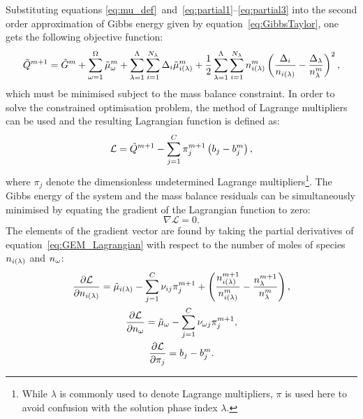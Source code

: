Substituting equations \eqref{eq:mu_def}~and~\eqref{eq:partial1}--\eqref{eq:partial3} into the second order approximation of Gibbs energy given by equation~\eqref{eq:GibbsTaylor}, one gets the following objective function:
\begin{equation}
  \tilde{Q}^{m+1} = \tilde{G}^{m} + \sum_{\omega=1}^{\Omega} \tilde{\mu}_{\omega}^m
                  + \sum_{\lambda=1}^{\Lambda} \sum_{i = 1}^{N_{\lambda}} \Delta_i \tilde{\mu}_{i(\lambda)}^m
                  + \frac{1}{2} \sum_{\lambda=1}^{\Lambda} \sum_{i = 1}^{N_{\lambda}} n_{i(\lambda)}^m \left(\frac{\Delta_i}{n_{i(\lambda)}} - \frac{\Delta_\lambda}{n_\lambda^m} \right)^2,
\end{equation}
which must be minimised subject to the mass balance constraint. In order to solve the constrained optimisation problem, the method of Lagrange multipliers can be used and the resulting Lagrangian function is defined as:
  \begin{equation}\label{eq:GEM_Lagrangian}
      \mathcal{L} = \tilde{Q}^{m+1} - \sum_{j = 1}^{C} \pi_{j}^{m+1} \left(b_{j} - b_{j}^m\right),
  \end{equation}
where $\pi_{j}$ denote the dimensionless undetermined Lagrange multipliers\footnote{While $\lambda$ is commonly used to denote Lagrange multipliers, $\pi$ is used here to avoid confusion with the solution phase index $\lambda$.}. The Gibbs energy of the system and the mass balance residuals can be simultaneously minimised by equating the gradient of the Lagrangian function to zero:
\begin{equation}
  \nabla \mathcal{L} = 0.
\end{equation}
The elements of the gradient vector are found by taking the partial derivatives of  equation~\eqref{eq:GEM_Lagrangian} with respect to the number of moles of species $n_{i(\lambda)}$ and $n_\omega$:
\begin{gather}
  \frac{\partial \mathcal{L}}{\partial n_{i(\lambda)}} = \tilde{\mu}_{i(\lambda)} - \sum_{j = 1}^{C} \nu_{ij} \pi_j^{m+1} + \left(\frac{n_{i(\lambda)}^{m+1}}{n_{i(\lambda)}^{m}} - \frac{n_\lambda^{m+1}}{n_\lambda^{m}} \right), \label{eq:pderL1}\\
  \frac{\partial \mathcal{L}}{\partial n_\omega} = \tilde{\mu}_{\omega} - \sum_{j = 1}^{C} \nu_{\omega j} \pi_{j}^{m+1},\\
  \frac{\partial \mathcal{L}}{\partial \pi_j} = b_{j} - b_{j}^m.
\end{gather}

